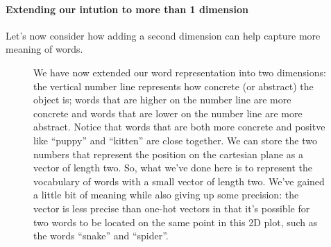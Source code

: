 \documentclass[12pt]{article}
\begin{document}
\paragraph{Extending our intution to more than 1 dimension}
Let's now consider how adding a second dimension can help capture more meaning of words.

\begin{figure}[h!]
  \begin{center}
  \caption{We have now extended our word representation into two dimensions: the vertical number line represents how concrete (or abstract) the object is; words that are higher on the number line are more concrete and words that are lower on the number line are more abstract. Notice that words that are both more concrete and positve like ``puppy'' and ``kitten'' are close together. We can store the two numbers that represent the position on the cartesian plane as a vector of length two. So, what we've done here is to represent the vocabulary of words with a small vector of length two. We've gained a little bit of meaning while also giving up some precision: the vector is less precise than one-hot vectors in that it's possible for two words to be located on the same point in this 2D plot, such as the words ``snake'' and ``spider''.}
\end{center}
\end{figure}
\end{document}
